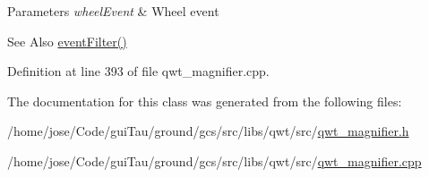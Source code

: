 \begin{DoxyParams}{Parameters}
{\em wheel\-Event} & Wheel event \\
\hline
\end{DoxyParams}
\begin{DoxySeeAlso}{See Also}
\hyperlink{class_qwt_magnifier_ae7f4c0ad7631501cec17abe31695281f}{event\-Filter()} 
\end{DoxySeeAlso}


Definition at line 393 of file qwt\-\_\-magnifier.\-cpp.



The documentation for this class was generated from the following files\-:\begin{DoxyCompactItemize}
\item 
/home/jose/\-Code/gui\-Tau/ground/gcs/src/libs/qwt/src/\hyperlink{qwt__magnifier_8h}{qwt\-\_\-magnifier.\-h}\item 
/home/jose/\-Code/gui\-Tau/ground/gcs/src/libs/qwt/src/\hyperlink{qwt__magnifier_8cpp}{qwt\-\_\-magnifier.\-cpp}\end{DoxyCompactItemize}
